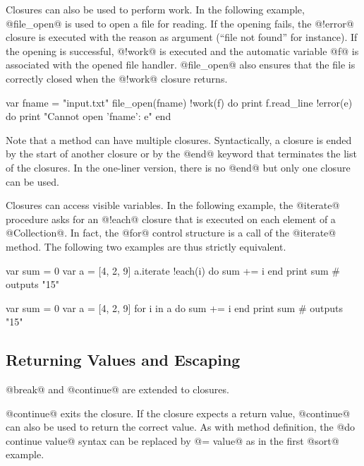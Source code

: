 Closures can also be used to perform work.
In the following example, @file_open@ is used to open a file for reading.
If the opening fails, the @!error@ closure is executed with the reason as argument (``file not found'' for instance).
If the opening is successful, @!work@ is executed and the automatic variable @f@ is associated with the opened file handler.
@file_open@ also ensures that the file is correctly closed when the @!work@ closure returns.

\begin{lst}
var fname = "input.txt"
file_open(fname) !work(f) do
	print f.read_line
!error(e) do
	print "Cannot open '{fname}': {e}"
end
\end{lst}

Note that a method can have multiple closures.
Syntactically, a closure is ended by the start of another closure or by the @end@ keyword that terminates the list of the closures.
In the one-liner version, there is no @end@ but only one closure can be used.

Closures can access visible variables.
In the following example, the @iterate@ procedure asks for an @!each@ closure that is executed on each element of a @Collection@.
In fact, the @for@ control structure is a call of the @iterate@ method.
The following two examples are thus strictly equivalent.

\begin{multicols}{2}
\begin{lst}
var sum = 0
var a = [4, 2, 9]
a.iterate !each(i) do
	sum += i
end
print sum # outputs "15"
\end{lst}
\columnbreak
\begin{lst}
var sum = 0
var a = [4, 2, 9]
for i in a do
	sum += i
end
print sum # outputs "15"
\end{lst}
\end{multicols}

\subsection{Returning Values and Escaping}\label{closure return}

@break@ and @continue@ are extended to closures.

@continue@ exits the closure.
If the closure expects a return value, @continue@ can also be used to return the correct value.
As with method definition, the @do continue value@ syntax can be replaced by @= value@ as in the first @sort@ example.


